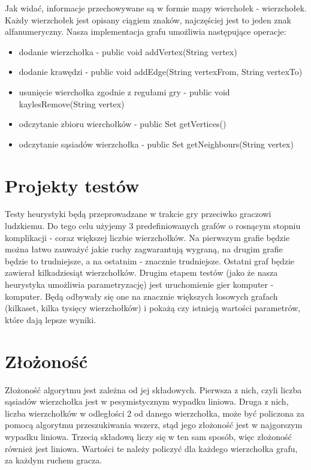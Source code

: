 \documentclass[11pt,a4paper]{article}
\begin{document}
Jak widać, informacje przechowywane są w formie mapy wierchołek - wierzchołek. Każdy wierzchołek jest opisany ciągiem znaków, najczęściej jest to jeden znak alfanumeryczny. Nasza implementacja grafu umożliwia następujące operacje:
\begin{itemize}
\item dodanie wierzchołka  - public void addVertex(String vertex)
\item dodanie krawędzi - public void addEdge(String vertexFrom, String vertexTo)
\item usunięcie wierchołka zgodnie z regułami gry - public void kaylesRemove(String vertex)
\item odczytanie zbioru wierchołków - public Set getVertices()
\item odczytanie sąsiadów wierzchołka - public Set getNeighbours(String vertex)
\end{itemize}

\section{Projekty testów}
Testy heurystyki będą przeprowadzane w trakcie gry przeciwko graczowi ludzkiemu. Do tego celu użyjemy 3 predefiniowanych grafów o rosnącym stopniu komplikacji - coraz większej liczbie wierzchołków. Na pierwszym grafie będzie można łatwo zauważyć jakie ruchy zagwarantują wygraną, na drugim grafie będzie to trudniejsze, a na ostatnim - znacznie trudniejsze. Ostatni graf będzie zawierał kilkadziesiąt wierzchołków.
Drugim etapem testów (jako że nasza heurystyka umożliwia parametryzację) jest uruchomienie gier komputer - komputer. Będą odbywały się one na znacznie większych losowych grafach (kilkaset, kilka tysięcy wierzchołków) i pokażą czy istnieją wartości parametrów, które dają lepsze wyniki.

\section{Złożoność}
Złożoność algorytmu jest zależna od jej składowych. Pierwsza z nich, czyli liczba sąsiadów wierzchołka jest w pesymistycznym wypadku liniowa. Druga z nich, liczba wierzchołków w odległości 2 od danego wierzchołka, może być policzona za pomocą algorytmu przeszukiwania wszerz, stąd jego złożoność jest w najgorszym wypadku liniowa. Trzecią składową liczy się w ten sam sposób, więc złożoność również jest liniowa. Wartości te należy policzyć dla każdego wierzchołka grafu, za każdym ruchem gracza.
\end{document}
